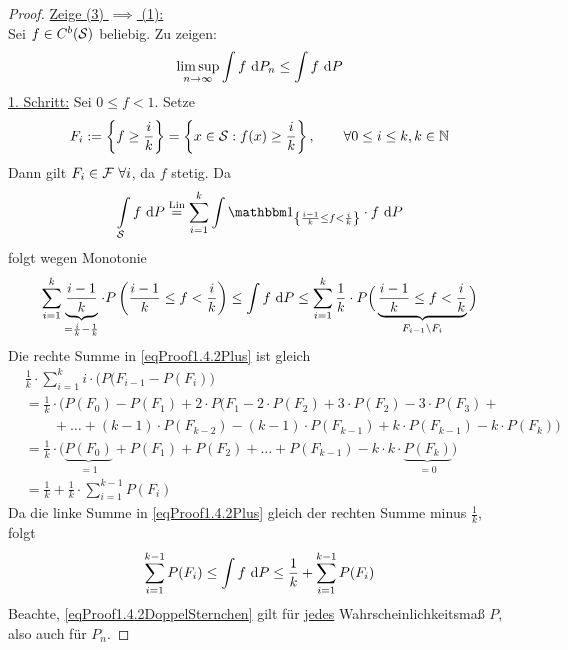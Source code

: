 \begin{proof}
	\underline{Zeige (3) $\implies$ (1):}\\
	Sei $f\in C^b(\S)$ beliebig. Zu zeigen:
	\begin{align}\label{eqProof1.4.2Sternchen}
		\limsup\limits_{n\to\infty}\int\limits f\d P_n\leq\int\limits f\d P
	\end{align}
	\underline{1. Schritt:} Sei $0\leq f<1$. Setze
	\begin{align*}
		F_i:=\left\lbrace f\geq\frac{i}{k}\right\rbrace=\left\lbrace x\in\S:f(x)\geq\frac{i}{k}\right\rbrace,\qquad \forall 0\leq i\leq k,k\in\N
	\end{align*}
	Dann gilt $F_i\in\F~\forall i$, da $f$ stetig. Da 
	\begin{align*}
		\int\limits_{\S}f\d P
		\stackeq{\text{Lin}}
		\sum\limits_{i=1}^k\int\limits\indi_{\left\lbrace\frac{i-1}{k}\leq f<\frac{i}{k}\right\rbrace}\cdot f\d P
	\end{align*}
	folgt wegen Monotonie
	\begin{align}\label{eqProof1.4.2Plus}
		\sum\limits_{i=1}^k\underbrace{\frac{i-1}{k}}_{=\frac{i}{k}-\frac{1}{k}}\cdot P\left(\frac{i-1}{k}\leq f<\frac{i}{k}\right)
		\leq
		\int\limits f\d P
		\leq
		\sum\limits_{i=1}^k \frac{1}{k}\cdot P\Big(\underbrace{\frac{i-1}{k}\leq f<\frac{i}{k}}_{F_{i-1}\setminus F_i}\Big)
	\end{align}
	Die rechte Summe in \eqref{eqProof1.4.2Plus} ist gleich
	\begin{align*}
		&\frac{1}{k}\cdot\sum\limits_{i=1}^k i\cdot\big( P(F_{i-1}-P(F_i)\big)\\
		&=\frac{1}{k}\cdot\Big(P(F_0)-P(F_1)+2\cdot P(F_1-2\cdot P(F_2)+3\cdot P(F_2)-3\cdot P(F_3)+\\
		&\qquad+\ldots+(k-1)\cdot P(F_{k-2})-(k-1)\cdot P(F_{k-1})+k\cdot P(F_{k-1})-k\cdot P(F_k)\Big)\\
		&=\frac{1}{k}\cdot\Big(\underbrace{P(F_0)}_{=1}+P(F_1)+P(F_2)+\ldots+P(F_{k-1})-k\cdot k\cdot \underbrace{P(F_k)}_{=0}\Big)\\
		&=\frac{1}{k}+\frac{1}{k}\cdot\sum\limits_{i=1}^{k-1} P(F_i)
	\end{align*}
	Da die linke Summe in \eqref{eqProof1.4.2Plus} gleich der rechten Summe minus $\frac{1}{k}$, folgt
	\begin{align}\label{eqProof1.4.2DoppelSternchen}
		\sum\limits_{i=1}^{k-1} P(F_i)
		\leq\int\limits f\d P
		\leq\frac{1}{k}+\sum\limits_{i=1}^{k-1} P(F_i)
	\end{align}
	Beachte, \eqref{eqProof1.4.2DoppelSternchen} gilt für \ul{jedes} Wahrscheinlichkeitsmaß $P$, also auch für $P_n$. 

\end{proof}
